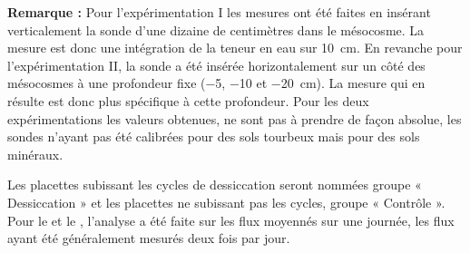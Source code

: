 \begin{center}
\begin{minipage}{.85\textwidth}
\setlength{\parindent}{-10pt}%
\onehalfspacing
\textbf{Remarque :} %
Pour l'expérimentation I les mesures ont été faites en insérant verticalement la sonde d'une dizaine de centimètres dans le mésocosme.
La mesure est donc une intégration de la teneur en eau sur \SI{10}{\centi\metre}.
En revanche pour l'expérimentation II, la sonde a été insérée horizontalement sur un côté des mésocosmes à une profondeur fixe (\num{-5}, \num{-10} et \SI{-20}{\centi\metre}).
La mesure qui en résulte est donc plus spécifique à cette profondeur.
Pour les deux expérimentations les valeurs obtenues, ne sont pas à prendre de façon absolue, les sondes n'ayant pas été calibrées pour des sols tourbeux mais pour des sols minéraux.
\end{minipage}
\end{center}
Les placettes subissant les cycles de dessiccation seront nommées groupe « Dessiccation » et les placettes ne subissant pas les cycles, groupe « Contrôle ».
Pour le \coo et le \chh, l'analyse a été faite sur les flux moyennés sur une journée, les flux ayant été généralement mesurés deux fois par jour.



